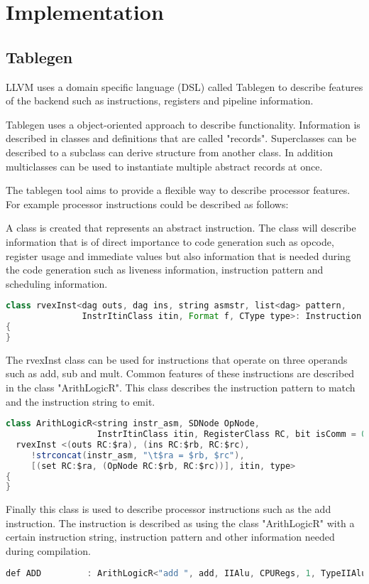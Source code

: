 \chapter{Implementation}
\label{chap:implementation}
\section{Tablegen}
LLVM uses a domain specific language (DSL) called Tablegen to describe features of the backend such as instructions, registers and pipeline information. 

Tablegen uses a object-oriented approach to describe functionality. Information is described in classes and definitions that are called "records". Superclasses can be described to a subclass can derive structure from another class. In addition multiclasses can be used to instantiate multiple abstract records at once.

The tablegen tool aims to provide a flexible way to describe processor features. For example processor instructions could be described as follows:

A class is created that represents an abstract instruction. The class will describe information that is of direct importance to code generation such as opcode, register usage and immediate values but also information that is needed during the code generation such as liveness information, instruction pattern and scheduling information.

\begin{lstlisting}[language=java]
class rvexInst<dag outs, dag ins, string asmstr, list<dag> pattern,
               InstrItinClass itin, Format f, CType type>: Instruction
{
}
\end{lstlisting}

The rvexInst class can be used for instructions that operate on three operands such as add, sub and mult. Common features of these instructions are described in the class "ArithLogicR". This class describes the instruction pattern to match and the instruction string to emit. 
\begin{lstlisting}[language=java]
class ArithLogicR<string instr_asm, SDNode OpNode,
                  InstrItinClass itin, RegisterClass RC, bit isComm = 0, CType type>:
  rvexInst <(outs RC:$ra), (ins RC:$rb, RC:$rc),
     !strconcat(instr_asm, "\t$ra = $rb, $rc"),
     [(set RC:$ra, (OpNode RC:$rb, RC:$rc))], itin, type> 
{
}
\end{lstlisting}

Finally this class is used to describe processor instructions such as the add instruction. The instruction is described as using the class "ArithLogicR" with a certain instruction string, instruction pattern and other information needed during compilation.
\begin{lstlisting}[language=java]
def ADD         : ArithLogicR<"add ", add, IIAlu, CPURegs, 1, TypeIIAlu>;
\end{lstlisting}

